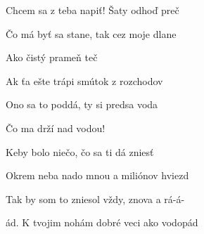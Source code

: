 \begin{song}
\begin{chorusbox}{\Refren}
Chcem sa z teba napiť!  Šaty odhoď preč  \par
Čo má byť sa stane, tak cez moje dlane  \par
Ako čistý prameň teč   \par
Ak ťa ešte trápi  smútok z rozchodov  \par
Ono sa to poddá, ty si predsa voda  \par
Čo ma drží nad vodou!   \par
\end{chorusbox}

\bigskip

 Keby bolo niečo,  čo sa ti dá zniesť \par
{} Okrem neba nado mnou a  miliónov hviezd  \par
{} Tak by som to zniesol  vždy, znova a rá-á- \par
{}ád. K tvojim nohám dobré veci  ako vodopád  \par
{} \par

\bigskip

\Refren

\bigskip

\Refren\ 

\end{song}

